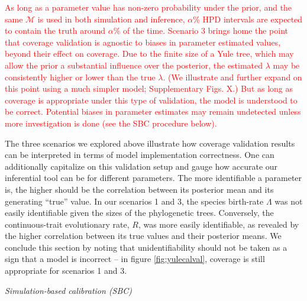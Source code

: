\documentclass[oneside]{article}
\begin{document}
\textcolor{red}{As long as a parameter value has non-zero probability under the prior, and the same $\mathcal{M}$ is used in both simulation and inference, $\alpha$\% HPD intervals are expected to contain the truth around $\alpha$\% of the time.
Scenario 3 brings home the point that coverage validation is agnostic to biases in parameter estimated values, beyond their effect on coverage.
Due to the finite size of a Yule tree, which may allow the prior a substantial influence over the posterior, the estimated $\lambda$ may be consistently higher or lower than the true $\lambda$.
(We illustrate and further expand on this point using a much simpler model; Supplementary Figs. X.)
But as long as coverage is appropriate under this type of validation, the model is understood to be correct.
Potential biases in parameter estimates may remain undetected unless more investigation is done (see the SBC procedure below).}

The three scenarios we explored above illustrate how coverage validation results can be interpreted in terms of model implementation correctness.
One can additionally capitalize on this validation setup and gauge how accurate our inferential tool can be for different parameters. 
The more identifiable a parameter is, the higher should be the correlation between its posterior mean and its generating ``true'' value.
In our scenarios 1 and 3, the species birth-rate $\Lambda$ was not easily identifiable given the sizes of the phylogenetic trees.
Conversely, the continuous-trait evolutionary rate, $R$, was more easily identifiable, as revealed by the higher correlation between its true values and their posterior means.
We conclude this section by noting that unidentifiability should not be taken as a sign that a model is incorrect -- in figure \ref{fig:yulecalval}, coverage is still appropriate for scenarios 1 and 3.

\vspace{.25cm}

\noindent \emph{Simulation-based calibration (SBC)}
\end{document}
